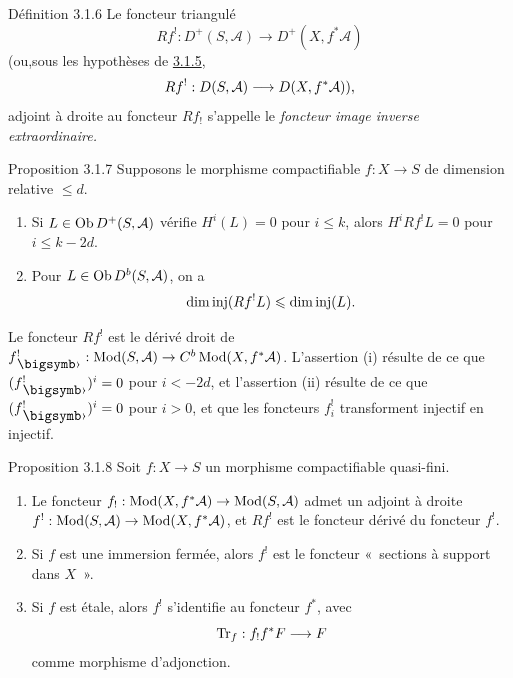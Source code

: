 \documentclass[10pt]{../fichiers-configuration-latex/smfart}
\begin{document}
\begin{enonce*}{Définition 3.1.6}
Le foncteur triangulé
$$
Rf^{!}:D^{+}(S,\mathcal{A})\longrightarrow
D^{+}(X,f^{\ast}\mathcal{A})
$$
(ou,\pageoriginale sous les hypothèses de \hyperref[XVIII.rem3.1.5]{3.1.5},
$$
Rf^{!}:D(S,\mathcal{A})\longrightarrow
D(X,f^{\ast}\mathcal{A})){},
$$
adjoint à droite au foncteur $Rf_{!}$  s'appelle le
\emph{foncteur image inverse extraordinaire.}
\end{enonce*}

\begin{enonce*}{Proposition 3.1.7}
Supposons le morphisme compactifiable $f:X\rightarrow S$ de dimension
relative $\leq d$.
\begin{enumerate}
\renewcommand{\theenumi}{\roman{enumi}}
\renewcommand{\labelenumi}{(\theenumi)}
\item Si $L\in \operatorname{Ob} D^{+}(S,\mathcal{A})$ vérifie $H^{i}(L)=0$ pour
$i\leq k$, alors $H^{i}Rf^{!}L=0$ pour $i\leq k-2d$.

\item Pour $L\in \operatorname{Ob} D^{b}(S,\mathcal{A})$, on a
$$
\dim \operatorname{inj} (Rf^{!}L)\leqslant \dim \operatorname{inj} (L){}.
$$
\end{enumerate}
\end{enonce*}

Le foncteur $Rf^{!}$ est le dérivé droit de
$f^{!}_{\bigdot}:\Mod(S,\mathcal{A})\rightarrow
C^{b}\Mod(X,f^{\ast}\mathcal{A})$. L'assertion (i) résulte de ce que
$(f^{!}_{\bigdot})^{i}=0$ pour $i<-2d$, et l'assertion (ii) résulte de
ce que $(f^{!}_{\bigdot})^{i}=0$ pour $i>0$, et que les foncteurs
$f^{!}_{i}$ transforment injectif en injectif.

\begin{enonce*}{Proposition 3.1.8}
Soit $f:X\rightarrow S$ un morphisme compactifiable quasi-fini.
\begin{enumerate}
\renewcommand{\theenumi}{\roman{enumi}}
\renewcommand{\labelenumi}{(\theenumi)}
\item Le foncteur $f_{!}:\operatorname{Mod}(X,f^{\ast}\mathcal{A})\rightarrow
\operatorname{Mod}(S,\mathcal{A})$ admet un adjoint à droite
$f^{!}:\operatorname{Mod}(S,\mathcal{A})\rightarrow \operatorname{Mod}(X,f^{\ast}\mathcal{A})$, et
$Rf^{!}$ est le foncteur dérivé du foncteur $f^{!}$.

\item Si $f$ est une immersion fermée, alors $f^{!}$ est le foncteur
« sections à support dans $X$ ».

\item Si $f$ est étale, alors $f^{!}$ s'identifie au foncteur
$f^{\ast}$, avec 
$$
\operatorname{Tr}_{f}:f_{!}f^{\ast}F\longrightarrow F
$$
comme morphisme d'adjonction.
\end{enumerate}
\end{enonce*}
\end{document}

